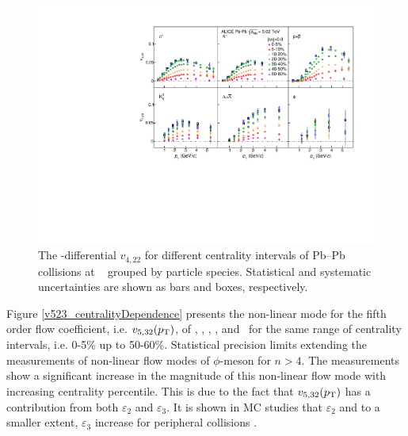 \begin{figure}[!htb]
\begin{center}
\includegraphics[scale=0.82]{figures/results/All_v422_gap00_CentDep_PID2.pdf}
\end{center}
\caption{The \pT-differential $v_{4,22}$ for different centrality intervals of Pb--Pb collisions at \sNN~ grouped by particle species. Statistical and systematic uncertainties are shown as bars and boxes, respectively.}
\label{v422_centralityDependence}
\end{figure}
 
Figure \ref{v523_centralityDependence} presents the non-linear mode for the fifth order flow coefficient, i.e. $v_{5,32}(p_{\rm{T}})$, of \pion, \kaon, \Ks, \proton, and \lambdas~for the same range of centrality intervals, i.e. 0-5\% up to 50-60\%. Statistical precision limits extending the measurements of non-linear flow modes of $\phi$-meson for $n>4$. The measurements show a significant increase in the magnitude of this non-linear flow mode with increasing centrality percentile. This is due to the fact that $v_{5,32}(p_{\rm{T}})$ has a contribution from both $\varepsilon_{2}$ and $\varepsilon_{3}$. It is shown in MC studies that $\varepsilon_{2}$ and to a smaller extent, $\varepsilon_{3}$ increase for peripheral collisions \cite{Alver:2010gr}. 

